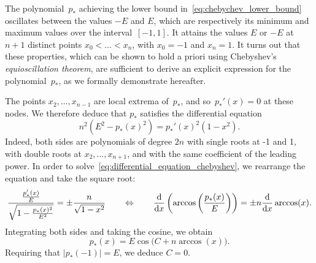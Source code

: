 \begin{remark}
    \label{remark:cheb}
    The polynomial~$p_*$ achieving the lower bound in~\eqref{eq:chebychev_lower_bound}
    oscillates between the values $-E$ and $E$,
    which are respectively its minimum and maximum values over the interval~$[-1, 1]$.
    It attains the values $E$ or $-E$ at $n+1$ distinct points $x_0 < \dotsc < x_n$,
    with $x_0 = -1$ and $x_n = 1$.
    It turns out that these properties,
    which can be shown to hold a priori using Chebyshev's \emph{equioscillation theorem},
    are sufficient to derive an explicit expression for the polynomial~$p_*$,
    as we formally demonstrate hereafter.

    The points $x_2, \dotsc, x_{n-1}$
    are local extrema of~$p_*$,
    and so~$p_*'(x) = 0$ at these nodes.
    We therefore deduce that $p_*$ satisfies the differential equation
    \begin{equation}
        \label{eq:differential_equation_chebyshev}
        n^2\left(E^2 - p_*(x)^2\right) = p_*'(x)^2 (1 - x^2).
    \end{equation}
    Indeed, both sides are polynomials of degree $2n$ with single roots at -1 and 1,
    with double roots at $x_2, \dotsc, x_{n+1}$,
    and with the same coefficient of the leading power.
    In order to solve~\eqref{eq:differential_equation_chebyshev},
    we rearrange the equation and take the square root:
    \[
        \frac{\frac{p_*'(x)}{E}}{\sqrt{1 - \frac{p_*(x)^2}{E^2}}} = \pm \frac{n}{\sqrt{1 - x^2}}
        \qquad \Leftrightarrow \qquad
        \frac{\mathrm d}{\mathrm d x} \left( \arccos\left(\frac{p_*(x)}{E}\right) \right) = \pm n \frac{\mathrm d}{\mathrm d x} \arccos(x).
    \]
    Integrating both sides and taking the cosine,
    we obtain
    \[
        p_*(x) = E \cos\bigl(C + n \arccos(x)\bigr).
    \]
    Requiring that $|p_*(-1)| = E$, we deduce $C = 0$.
\end{remark}

